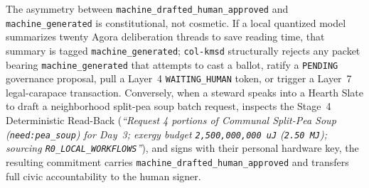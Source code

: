 \begin{table}[htbp]
\centering
\caption{The four mandatory cryptographic provenance tags enforced across \texttt{col-gatewayd} and \texttt{col-kmsd}.}
\label{tab:provenance-tags}
\footnotesize
{}
\end{table}

The asymmetry between \texttt{machine\_drafted\_human\_approved} and \texttt{machine\_generated} is constitutional, not cosmetic. If a local quantized model summarizes twenty Agora deliberation threads to save reading time, that summary is tagged \texttt{machine\_generated}; \texttt{col-kmsd} structurally rejects any packet bearing \texttt{machine\_generated} that attempts to cast a ballot, ratify a \texttt{PENDING} governance proposal, pull a Layer~4 \texttt{WAITING\_HUMAN} token, or trigger a Layer~7 legal-carapace transaction. Conversely, when a steward speaks into a Hearth Slate to draft a neighborhood split-pea soup batch request, inspects the Stage~4 Deterministic Read-Back (\emph{``Request 4 portions of Communal Split-Pea Soup (\texttt{need:pea\_soup}) for Day~3; exergy budget \texttt{2,500,000,000 uJ} (\texttt{2.50 MJ}); sourcing \texttt{R0\_LOCAL\_WORKFLOWS}''}), and signs with their personal hardware key, the resulting commitment carries \texttt{machine\_drafted\_human\_approved} and transfers full civic accountability to the human signer.

